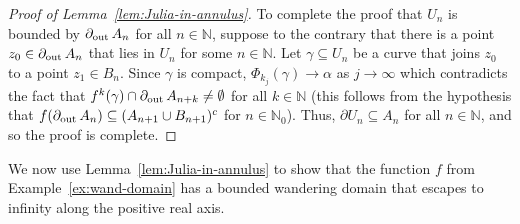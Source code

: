 \documentclass[a4paper, 12pt, reqno]{amsart}
\numberwithin{equation}{section}
\theoremstyle{plain}
\theoremstyle{definition}
\theoremstyle{remark}
\newcommand{\N}{{\mathbb{N}}}
\begin{document}
\begin{proof}[Proof of Lemma~\ref{lem:Julia-in-annulus}]

To complete the proof that $U_n$ is bounded by $\partial_\textup{out}\,A_n$ for all $n\in\N$, suppose to the contrary that there is a point $z_0\in\partial_\textup{out}\,A_n$ that lies in $U_n$ for some $n\in\N$. Let $\gamma\subseteq U_n$ be a curve that joins $z_0$ to a point $z_1\in B_n$. Since $\gamma$ is compact, $\Phi_{k_j}(\gamma)\to \alpha$ as $j\to\infty$ which contradicts the fact that $f^k(\gamma)\cap \partial_\textup{out}\,A_{n+k}\neq\emptyset$ for all $k\in\N$ (this follows from the hypothesis that $f(\partial_\textup{out}\,A_n)\subseteq (A_{n+1}\cup B_{n+1})^c$ for $n\in\N_0$). Thus, $\partial  U_n\subseteq A_n$ for all $n\in\N$, and so the proof is complete.
\end{proof}

We now use Lemma~\ref{lem:Julia-in-annulus} to show that the function $f$ from Example~\ref{ex:wand-domain} has a bounded wandering domain that escapes to infinity along the positive real axis.
\end{document}
